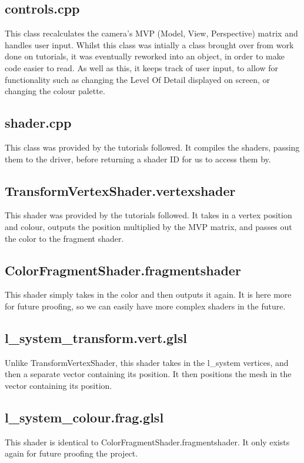 \documentclass[a4paper,10pt]{report}
\begin{document}
\subsection{controls.cpp}

This class recalculates the camera's MVP (Model, View, Perspective) matrix and handles user input. Whilst this class was intially a class brought over from work done on tutorials, it was eventually reworked into an object, in order to make code easier to read. As well as this, it keeps track of user input, to allow for functionality such as changing the Level Of Detail displayed on screen, or changing the colour palette. 

\subsection{shader.cpp}
This class was provided by the tutorials followed. It compiles the shaders, passing them to the driver, before returning a shader ID for us to access them by. 

\subsection{TransformVertexShader.vertexshader}
This shader was provided by the tutorials followed. It takes in a vertex position and colour, outputs the position multiplied by the MVP matrix, and passes out the color to the fragment shader.


\subsection{ColorFragmentShader.fragmentshader} This shader simply takes in the color and then outputs it again. It is here more for future proofing, so we can easily have more complex shaders in the future.  

\subsection{l\_system\_transform.vert.glsl}
Unlike TransformVertexShader, this shader takes in the l\_system vertices, and then a separate vector containing its position. It then positions the mesh in the vector containing its position.


\subsection{l\_system\_colour.frag.glsl}
This shader is identical to ColorFragmentShader.fragmentshader. It only exists again for future proofing the project. 
\end{document}
